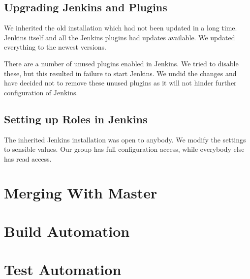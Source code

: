 \subsection{Upgrading Jenkins and Plugins}
We inherited the old installation which had not been updated in a long time. Jenkins itself and all the Jenkins plugins had updates available. We updated everything to the newest versions.

There are a number of unused plugins enabled in Jenkins. We tried to disable these, but this resulted in failure to start Jenkins. We undid the changes and have decided not to remove these unused plugins as it will not hinder further configuration of Jenkins.

\subsection{Setting up Roles in Jenkins}
The inherited Jenkins installation was open to anybody. We modify the settings to sensible values. Our group has full configuration access, while everybody else has read access.

\section{Merging With Master}\label{sec:branching_strategy}

\section{Build Automation}\label{sec:build_automation}

\section{Test Automation}\label{sec:test_automation}
\dummy~\dummy~\dummy~
